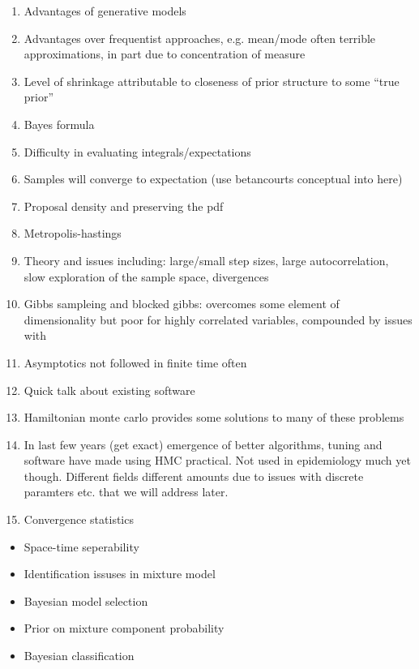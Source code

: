 \documentclass[11pt]{report}
\begin{document}
\begin{enumerate}
\item Advantages of generative models
\item Advantages over frequentist approaches, e.g. mean/mode often terrible approximations, in part due to concentration of measure
\item Level of shrinkage attributable to closeness of prior structure to some ``true prior''
\item Bayes formula
\item Difficulty in evaluating integrals/expectations
\item Samples will converge to expectation (use betancourts conceptual into here)
\item Proposal density and preserving the pdf
\item Metropolis-hastings
\item Theory and issues including: large/small step sizes, large autocorrelation, slow exploration of the sample space, divergences
\item Gibbs sampleing and blocked gibbs: overcomes some element of dimensionality but poor for highly correlated variables, compounded by issues with 
\item Asymptotics not followed in finite time often
\item Quick talk about existing software
\item Hamiltonian monte carlo provides some solutions to many of these problems
\item In last few years (get exact) emergence of better algorithms, tuning and software have made using HMC practical. Not used in epidemiology much yet though. Different fields different amounts due to issues with discrete paramters etc. that we will address later.
\item Convergence statistics
\end{enumerate}

\begin{itemize}

\item Space-time seperability

\item Identification issuses in mixture model

\item Bayesian model selection

\item Prior on mixture component probability

\item Bayesian classification

\end{itemize}
\end{document}
